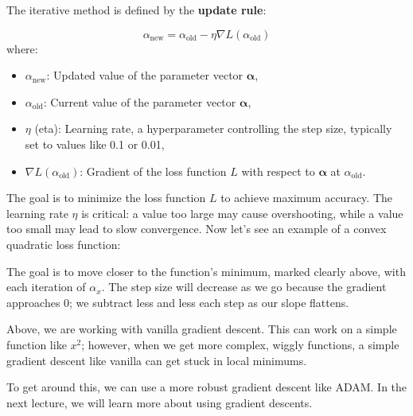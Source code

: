 The iterative method is defined by the \textbf{update rule}:

\begin{equation}
    \alpha_{\text{new}} = \alpha_{\text{old}} - \eta \nabla L(\alpha_{\text{old}})
\end{equation}
where:
\begin{itemize}
    \item \( \alpha_{\text{new}} \): Updated value of the parameter vector \( \boldsymbol{\alpha} \),
    \item \( \alpha_{\text{old}} \): Current value of the parameter vector \( \boldsymbol{\alpha} \),
    \item \( \eta \) (eta): Learning rate, a hyperparameter controlling the step size, typically set to values like 0.1 or 0.01,
    \item \( \nabla L(\alpha_{\text{old}}) \): Gradient of the loss function \( L \) with respect to \( \boldsymbol{\alpha} \) at \( \alpha_{\text{old}} \).
\end{itemize}

The goal is to minimize the loss function \( L \) to achieve maximum accuracy. The learning rate \( \eta \) is critical: a value too large may cause overshooting, while a value too small may lead to slow convergence. Now let's see an example of a convex quadratic loss function:

\begin{center}
\end{center}

The goal is to move closer to the function's minimum, marked clearly above, with each iteration of $\alpha_x$. The step size will decrease as we go because the gradient approaches $0$; we subtract less and less each step as our slope flattens. 

Above, we are working with vanilla gradient descent. This can work on a simple function like $x^2$; however, when we get more complex, wiggly functions, a simple gradient descent like vanilla can get stuck in local minimums.

To get around this, we can use a more robust gradient descent like ADAM. In the next lecture, we will learn more about using gradient descents. 
